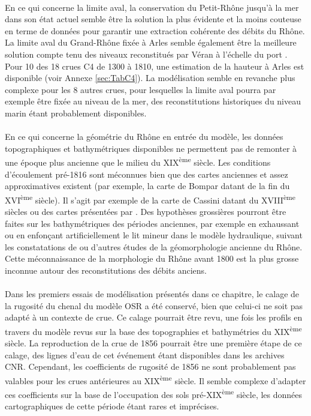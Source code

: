 \documentclass[11pt]{article}
\begin{document}
	\paragraph{} En ce qui concerne la limite aval, la conservation du Petit-Rhône jusqu'à la mer dans son état actuel semble être la solution la plus évidente et la moins couteuse en terme de données pour garantir une extraction cohérente des débits du Rhône. La limite aval du Grand-Rhône fixée à Arles semble également être la meilleure solution compte tenu des niveaux reconstitués par Véran à l'échelle du port \citep{pichard_les_1995}. Pour 10 des 18 crues C4 de 1300 à 1810, une estimation de la hauteur à Arles est disponible (voir Annexe \ref{sec:TabC4}). La modélisation semble en revanche plus complexe pour les 8 autres crues, pour lesquelles la limite aval pourra par exemple être fixée au niveau de la mer, des reconstitutions historiques du niveau marin étant probablement disponibles.
	
	\paragraph{} En ce qui concerne la géométrie du Rhône en entrée du modèle, les données topographiques et bathymétriques disponibles ne permettent pas de remonter à une époque plus ancienne que le milieu du XIX\textsuperscript{ème} siècle. Les conditions d'écoulement pré-1816 sont méconnues bien que des cartes anciennes et assez approximatives existent (par exemple, la carte de Bompar datant de la fin du XVI\textsuperscript{ème} siècle). Il s'agit par exemple de la carte de Cassini datant du XVIII\textsuperscript{ème} siècles ou des cartes présentées par \citet{pichard_sept_2014}. Des hypothèses grossières pourront être faites sur les bathymétriques des périodes anciennes, par exemple en exhaussant ou en enfonçant artificiellement le lit mineur dans le modèle hydraulique, suivant les constatations de \citet{pichard_sept_2014} ou d'autres études de la géomorphologie ancienne du Rhône. Cette méconnaissance de la morphologie du Rhône avant 1800 est la plus grosse inconnue autour des reconstitutions des débits anciens.
	
	\paragraph{} Dans les premiers essais de modélisation présentés dans ce chapitre, le calage de la rugosité du chenal du modèle OSR a été conservé, bien que celui-ci ne soit pas adapté à un contexte de crue. Ce calage pourrait être revu, une fois les profils en travers du modèle revus sur la base des topographies et bathymétries du XIX\textsuperscript{ème} siècle. La reproduction de la crue de 1856 pourrait être une première étape de ce calage, des lignes d'eau de cet événement étant disponibles dans les archives CNR. Cependant, les coefficients de rugosité de 1856 ne sont probablement pas valables pour les crues antérieures au XIX\textsuperscript{ème} siècle. Il semble complexe d'adapter ces coefficients sur la base de l'occupation des sols pré-XIX\textsuperscript{ème} siècle, les données cartographiques de cette période étant rares et imprécises. 
	
\end{document}
